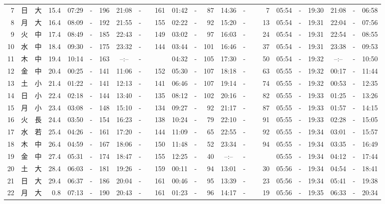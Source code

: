 \documentclass[12pt,a4j]{jsarticle}
\begin{document}
\begin{table}[htbp]
\begin{center}
{\begin{tabular}{|rc|cr|ccrccr|ccrccr|ccc|ccc|}
 7 & 日 & 大 & 15.4 &  07:29 &-& 196 &  21:08 &-& 161 &  01:42 &-&  87 &  14:36 &-&   7 & 05:54 & -& 19:30 & 21:08 & -& 06:58 \\
 8 & 月 & 大 & 16.4 &  08:09 &-& 192 &  21:55 &-& 155 &  02:22 &-&  92 &  15:20 &-&  13 & 05:54 & -& 19:31 & 22:04 & -& 07:56 \\
 9 & 火 & 中 & 17.4 &  08:49 &-& 185 &  22:43 &-& 149 &  03:02 &-&  97 &  16:03 &-&  24 & 05:54 & -& 19:31 & 22:54 & -& 08:55 \\
10 & 水 & 中 & 18.4 &  09:30 &-& 175 &  23:32 &-& 144 &  03:44 &-& 101 &  16:46 &-&  37 & 05:54 & -& 19:31 & 23:38 & -& 09:53 \\
11 & 木 & 中 & 19.4 &  10:14 &-& 163 &  --:-- &-&~~~~~ &  04:32 &-& 105 &  17:30 &-&  50 & 05:54 & -& 19:32 & --:-- & -& 10:50 \\
12 & 金 & 中 & 20.4 &  00:25 &-& 141 &  11:06 &-& 152 &  05:30 &-& 107 &  18:18 &-&  63 & 05:55 & -& 19:32 & 00:17 & -& 11:44 \\
13 & 土 & 小 & 21.4 &  01:22 &-& 141 &  12:13 &-& 141 &  06:46 &-& 107 &  19:14 &-&  74 & 05:55 & -& 19:32 & 00:53 & -& 12:35 \\
14 & 日 & 小 & 22.4 &  02:18 &-& 144 &  13:40 &-& 135 &  08:12 &-& 102 &  20:16 &-&  82 & 05:55 & -& 19:33 & 01:25 & -& 13:26 \\
15 & 月 & 小 & 23.4 &  03:08 &-& 148 &  15:10 &-& 134 &  09:27 &-&  92 &  21:17 &-&  87 & 05:55 & -& 19:33 & 01:57 & -& 14:15 \\
16 & 火 & 長 & 24.4 &  03:50 &-& 154 &  16:23 &-& 138 &  10:24 &-&  79 &  22:10 &-&  91 & 05:55 & -& 19:33 & 02:28 & -& 15:05 \\
17 & 水 & 若 & 25.4 &  04:26 &-& 161 &  17:20 &-& 144 &  11:09 &-&  65 &  22:55 &-&  92 & 05:55 & -& 19:34 & 03:01 & -& 15:57 \\
18 & 木 & 中 & 26.4 &  04:59 &-& 167 &  18:06 &-& 150 &  11:48 &-&  52 &  23:34 &-&  94 & 05:55 & -& 19:34 & 03:35 & -& 16:49 \\
19 & 金 & 中 & 27.4 &  05:31 &-& 174 &  18:47 &-& 155 &  12:25 &-&  40 &  --:-- &-&~~~~~ & 05:55 & -& 19:34 & 04:12 & -& 17:44 \\
20 & 土 & 大 & 28.4 &  06:03 &-& 181 &  19:26 &-& 159 &  00:11 &-&  94 &  13:01 &-&  30 & 05:56 & -& 19:34 & 04:54 & -& 18:41 \\
21 & 日 & 大 & 29.4 &  06:37 &-& 186 &  20:04 &-& 161 &  00:46 &-&  95 &  13:39 &-&  23 & 05:56 & -& 19:34 & 05:41 & -& 19:38 \\
22 & 月 & 大 &  0.8 &  07:13 &-& 190 &  20:43 &-& 161 &  01:23 &-&  96 &  14:17 &-&  19 & 05:56 & -& 19:35 & 06:33 & -& 20:34 \\

\end{tabular}}
\end{center}
\end{table}
\end{document}
